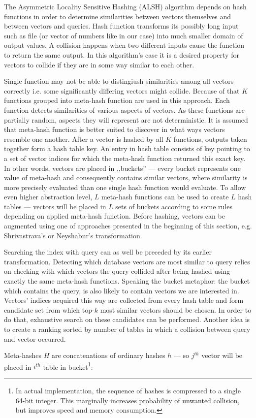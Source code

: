 The Asymmetric Locality Sensitive Hashing (ALSH) \cite{alsh} algorithm depends on hash functions
in order to determine similarities between vectors themselves and between vectors and queries.
Hash function transforms its possibly long input such as file (or vector of numbers like in our case)
into much smaller domain of output values.
A collision happens when two different inputs cause the function to return the same output.
In this algorithm's case it is a desired property for vectors to collide if they are in some way similar to each other.
\par
Single function may not be able to distingiush similarities among all vectors correctly i.e. some
significantly differing vectors might collide. Because of that $K$ functions grouped into
meta-hash function are used in this approach. Each function detects similarities of various aspects of vectors.
As these functions are partially random, aspects they will represent are not deterministic.
It is assumed that meta-hash function is better suited to discover in what ways vectors
resemble one another.
After a vector is hashed by all $K$ functions, outputs taken together form a hash table key.
An entry in hash table consists of key pointing to a set of vector indices for which the meta-hash function
returned this exact key. In other words, vectors are placed in ,,buckets'' ---
every bucket represents one value of meta-hash and consequently contains similar vectors, where
similarity is more precisely evaluated than one single hash function would evaluate.
To allow even higher abstraction level, $L$ meta-hash functions can be used to create $L$ hash tables ---
vectors will be placed in $L$ sets of buckets according to some rules depending on applied meta-hash function.
Before hashing, vectors can be augmented using one of approaches presented in the beginning
of this section, e.g. Shrivastrava's or Neyshabur's transformation.
\par
Searching the index with query can as well be preceded by its earlier transformation.
Detecting which database vectors are most similar to query relies on checking with which
vectors the query collided after being hashed using exactly the same meta-hash functions.
Speaking the bucket metaphor: the bucket which contains the query, is also likely to contain
vectors we are interested in.
Vectors' indices acquired this way are collected from every hash table and form candidate set from which top-$k$
most similar vectors should be chosen. In order to do that, exhaustive search on these candidates
can be performed.
Another idea is to create a ranking sorted by number of tables in which a collision
between query and vector occurred.
\par
Meta-hashes $H$ are concatenations of ordinary hashes $h$ --- so $j^{th}$ vector will be placed in 
$i^{th}$ table in bucket\footnote{
In actual implementation, the sequence of hashes is compressed to a single 64-bit integer. This
marginally increases probability of unwanted collision, but improves speed and memory consumption.
}:

